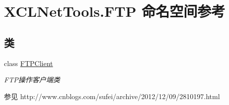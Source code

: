 \hypertarget{namespace_x_c_l_net_tools_1_1_f_t_p}{}\section{X\+C\+L\+Net\+Tools.\+F\+TP 命名空间参考}
\label{namespace_x_c_l_net_tools_1_1_f_t_p}
\subsection*{类}
\begin{DoxyCompactItemize}
\item 
class \hyperlink{class_x_c_l_net_tools_1_1_f_t_p_1_1_f_t_p_client}{F\+T\+P\+Client}
\begin{DoxyCompactList}\small\item\em F\+T\+P操作客户端类 \begin{DoxySeeAlso}{参见}
http\+://www.\+cnblogs.\+com/sufei/archive/2012/12/09/2810197.\+html


\end{DoxySeeAlso}
\end{DoxyCompactList}\end{DoxyCompactItemize}
